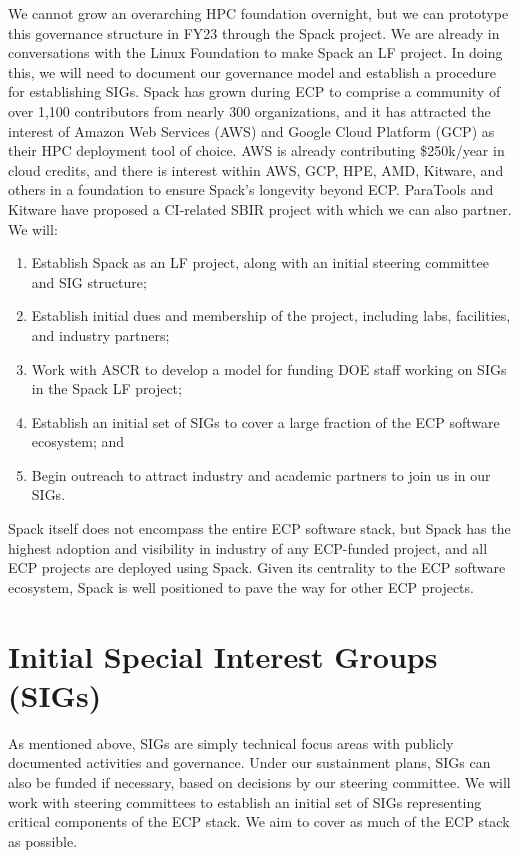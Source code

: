 \documentclass[11pt]{article}
\begin{document}
We cannot grow an overarching HPC foundation overnight, but we can prototype this
governance structure in FY23 through the Spack project. We are already in conversations
with the Linux Foundation to make Spack an LF project. In doing this, we will need to
document our governance model and establish a procedure for establishing SIGs. Spack has
grown during ECP to comprise a community of over 1,100 contributors from nearly 300
organizations, and it has attracted the interest of Amazon Web Services (AWS) and Google
Cloud Platform (GCP) as their HPC deployment tool of choice. AWS is already contributing
\$250k/year in cloud credits, and there is interest within AWS, GCP, HPE, AMD, Kitware,
and others in a foundation to ensure Spack's longevity beyond ECP. ParaTools and Kitware
have proposed a CI-related SBIR project with which we can also partner. We will:

\begin{enumerate}
\item Establish Spack as an LF project, along with an initial steering committee and SIG
  structure;
\item Establish initial dues and membership of the project, including labs, facilities,
  and industry partners;
\item Work with ASCR to develop a model for funding DOE staff working on SIGs in the
  Spack LF project;
\item Establish an initial set of SIGs to cover a large fraction of the ECP software
  ecosystem; and
\item Begin outreach to attract industry and academic partners to join us in our SIGs.
\end{enumerate}

Spack itself does not encompass the entire ECP software stack, but Spack has the highest
adoption and visibility in industry of any ECP-funded project, and all ECP projects are
deployed using Spack. Given its centrality to the ECP software ecosystem, Spack is well
positioned to pave the way for other ECP projects.

\section{Initial Special Interest Groups (SIGs)}

As mentioned above, SIGs are simply technical focus areas with publicly documented
activities and governance. Under our sustainment plans, SIGs can also be funded if
necessary, based on decisions by our steering committee. We will work with steering
committees to establish an initial set of SIGs representing critical components of the
ECP stack. We aim to cover as much of the ECP stack as possible.
\end{document}
